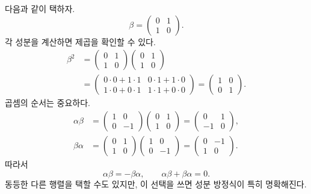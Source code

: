 다음과 같이 택하자.
\begin{equation}
\beta=
\begin{pmatrix}
0&1\\
1&0
\end{pmatrix}.
\end{equation}
각 성분을 계산하면 제곱을 확인할 수 있다.
\begin{equation}
\begin{aligned}
\beta^2
&=
\begin{pmatrix}
0&1\\
1&0
\end{pmatrix}
\begin{pmatrix}
0&1\\
1&0
\end{pmatrix}\\
&=
\begin{pmatrix}
0\cdot0+1\cdot1&0\cdot1+1\cdot0\\
1\cdot0+0\cdot1&1\cdot1+0\cdot0
\end{pmatrix}
=
\begin{pmatrix}
1&0\\
0&1
\end{pmatrix}.
\end{aligned}
\end{equation}
곱셈의 순서는 중요하다.
\begin{align}
\alpha\beta
&=
\begin{pmatrix}
1&0\\
0&-1
\end{pmatrix}
\begin{pmatrix}
0&1\\
1&0
\end{pmatrix}
=
\begin{pmatrix}
0&1\\
-1&0
\end{pmatrix},\\
\beta\alpha
&=
\begin{pmatrix}
0&1\\
1&0
\end{pmatrix}
\begin{pmatrix}
1&0\\
0&-1
\end{pmatrix}
=
\begin{pmatrix}
0&-1\\
1&0
\end{pmatrix}.
\end{align}
따라서
\begin{equation}
\alpha\beta=-\beta\alpha,
\qquad
\alpha\beta+\beta\alpha=0.
\end{equation}
동등한 다른 행렬을 택할 수도 있지만, 이 선택을 쓰면 성분 방정식이 특히 명확해진다.

